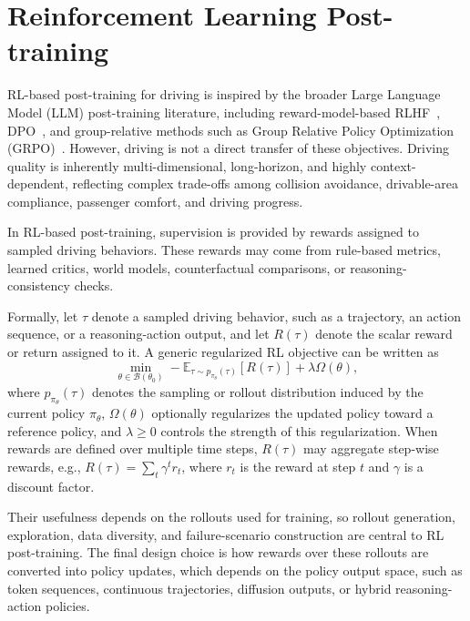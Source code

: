 \documentclass[runningheads]{llncs}
\begin{document}
\section{Reinforcement Learning Post-training}
\label{sec:rl}




RL-based post-training for driving is inspired by the broader Large Language Model (LLM) post-training literature, including reward-model-based RLHF~\cite{ouyang2022instructgpt}, DPO~\cite{rafailov2023dpo}, and group-relative methods such as Group Relative Policy Optimization (GRPO)~\cite{shao2024deepseekmath,deepseek_r1_2025}. However, driving is not a direct transfer of these objectives. Driving quality is inherently multi-dimensional, long-horizon, and highly context-dependent, reflecting complex trade-offs among collision avoidance, drivable-area compliance, passenger comfort, and driving progress.  
 

In RL-based post-training, supervision is provided by rewards assigned to sampled driving behaviors. These rewards may come from rule-based metrics, learned critics, world models, counterfactual comparisons, or reasoning-consistency checks.

Formally, let $\tau$ denote a sampled driving behavior, such as a trajectory, an action sequence, or a reasoning-action output, and let $R(\tau)$ denote the scalar reward or return assigned to it. A generic regularized RL objective can be written as
\begin{equation}
\min_{\theta \in \mathcal{B}(\theta_0)}
-
\mathbb{E}_{\tau\sim p_{\pi_\theta}(\tau)}
\left[
R(\tau)
\right]
+
\lambda\Omega(\theta),
\label{eq:rl_post_training}
\end{equation}
where $p_{\pi_\theta}(\tau)$ denotes the sampling or rollout distribution induced by the current policy $\pi_\theta$, $\Omega(\theta)$ optionally regularizes the updated policy toward a reference policy, and $\lambda\ge 0$ controls the strength of this regularization. When rewards are defined over multiple time steps, $R(\tau)$ may aggregate step-wise rewards, e.g., $R(\tau)=\sum_t \gamma^t r_t$, where $r_t$ is the reward at step $t$ and $\gamma$ is a discount factor.

Their usefulness depends on the rollouts used for training, so rollout generation, exploration, data diversity, and failure-scenario construction are central to RL post-training. The final design choice is how rewards over these rollouts are converted into policy updates, which depends on the policy output space, such as token sequences, continuous trajectories, diffusion outputs, or hybrid reasoning-action policies.
\end{document}
